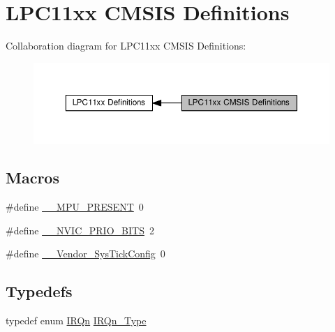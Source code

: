 \hypertarget{group___l_p_c11xx___c_m_s_i_s}{}\section{L\+P\+C11xx C\+M\+S\+IS Definitions}
\label{group___l_p_c11xx___c_m_s_i_s}
Collaboration diagram for L\+P\+C11xx C\+M\+S\+IS Definitions\+:\nopagebreak
\begin{figure}[H]
\begin{center}
\leavevmode
\includegraphics[width=350pt]{group___l_p_c11xx___c_m_s_i_s}
\end{center}
\end{figure}
\subsection*{Macros}
\begin{DoxyCompactItemize}
\item 
\#define \hyperlink{group___l_p_c11xx___c_m_s_i_s_ga4127d1b31aaf336fab3d7329d117f448}{\+\_\+\+\_\+\+M\+P\+U\+\_\+\+P\+R\+E\+S\+E\+NT}~0
\item 
\#define \hyperlink{group___l_p_c11xx___c_m_s_i_s_gae3fe3587d5100c787e02102ce3944460}{\+\_\+\+\_\+\+N\+V\+I\+C\+\_\+\+P\+R\+I\+O\+\_\+\+B\+I\+TS}~2
\item 
\#define \hyperlink{group___l_p_c11xx___c_m_s_i_s_gab58771b4ec03f9bdddc84770f7c95c68}{\+\_\+\+\_\+\+Vendor\+\_\+\+Sys\+Tick\+Config}~0
\end{DoxyCompactItemize}
\subsection*{Typedefs}
\begin{DoxyCompactItemize}
\item 
typedef enum \hyperlink{group___l_p_c11xx___c_m_s_i_s_ga666eb0caeb12ec0e281415592ae89083}{I\+R\+Qn} \hyperlink{group___l_p_c11xx___c_m_s_i_s_gac3af4a32370fb28c4ade8bf2add80251}{I\+R\+Qn\+\_\+\+Type}
\end{DoxyCompactItemize}
